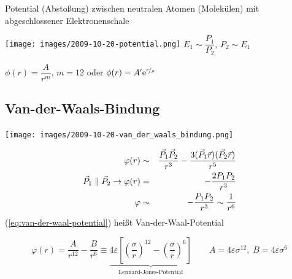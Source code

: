 Potential (Abstoßung) zwischen neutralen Atomen (Molekülen) mit abgeschlossener Elektronenschale

\texttt{[image: images/2009-10-20-potential.png]}
$E_1 \sim \dfrac{P_1}{P_2},\, P_2 \sim E_1$

$\phi (r)=\dfrac{A}{r^m},\, m=12$ oder $\phi(r)=A^\prime \text{e}^{\nicefrac{r}{\rho}}$

\subsection{Van-der-Waals-Bindung}

\texttt{[image: images/2009-10-20-van\_der\_waals\_bindung.png]}


\begin{eqnarray}
\varphi(r) & \sim & \dfrac{\vec{P}_1\vec{P}_2}{r^3}-\dfrac{3(\vec{P}_1\vec{r})(\vec{P}_2\vec{r})}{r^5} \notag \\
\vec{P}_1 \parallel \vec{P}_2 \to \varphi(r) & = & -\dfrac{2P_1 P_2}{r^3} \notag \\
\varphi & \sim & -\dfrac{P_1 P_2}{r^3} \sim \dfrac{1}{r^6}\label{eq:van-der-waal-potential}
\end{eqnarray}
(\ref{eq:van-der-waal-potential}) heißt Van-der-Waal-Potential

$$\varphi(r)=\dfrac{A}{r^{12}}-\dfrac{B}{r^6}\equiv \underbrace{4\varepsilon\left[\left(\dfrac{\sigma}{r}\right)^{12}-\left(\dfrac{\sigma}{r}\right)^6\right]}_{\text{Lennard-Jones-Potential}} \qquad A=4\varepsilon \sigma^{12},\;B=4\varepsilon \sigma^6$$